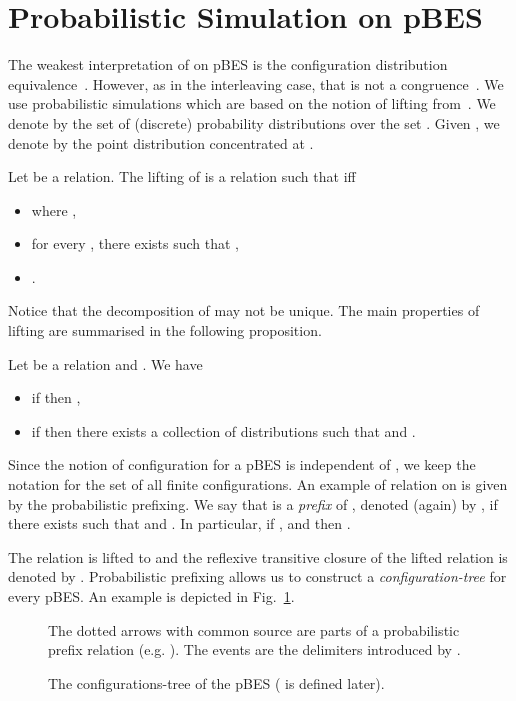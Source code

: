 \documentclass{llncs}
\newcommand{\<}{\langle}
\renewcommand{\>}{\rangle}
\begin{document}
\section{Probabilistic Simulation on pBES}\label{simulation}

The weakest interpretation of  on pBES is the configuration distribution equivalence~\cite{Var03}. However, as in the interleaving case, that is not a congruence~\cite{Seg95}. We use probabilistic simulations which are based on the notion of lifting from~\cite{Den07a}. We denote by  the set of (discrete) probability distributions over the set . Given , we denote by  the point distribution concentrated at .

Let  be a relation. The lifting of  is a relation  such that  iff
\begin{itemize}
\item  where ,
\item for every , there exists  such that ,
\item .
\end{itemize}

Notice that the decomposition of  may not be unique. The main properties of lifting are summarised in the following proposition.

\begin{proposition}\label{pro:lifting} 
Let  be a relation and . We have
\begin{itemize}
\item if  then ,
\item if  then there exists a collection of distributions   such that  and  .
\end{itemize}
\end{proposition}

Since the notion of configuration for a pBES  is independent of , we keep the notation  for the set of all finite configurations. An example of relation on  is given by the probabilistic prefixing. We say that  is a \textit{prefix} of , denoted (again) by , if there exists  such that  and . In particular, if ,  and  then .  

The relation  is lifted to  and the reflexive transitive closure of the lifted relation is denoted by . Probabilistic prefixing allows us to construct a \emph{configuration-tree} for every pBES. An example is depicted in Fig.~\ref{fig:configuration-tree}.
\begin{figure}[!ht]
\begin{tiny}

\end{tiny}
The dotted arrows with common source are parts of a probabilistic prefix relation (e.g. ). The events  are the delimiters introduced by .
\caption{The configurations-tree of the pBES  ( is defined later).}\label{fig:configuration-tree}
\end{figure}
\end{document}
